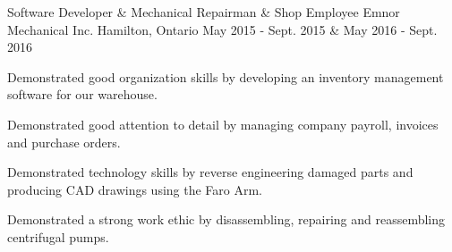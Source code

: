 \begin{cventries}
  \cventry
    {Software Developer \& Mechanical Repairman \& Shop Employee} %
    {Emnor Mechanical Inc.} %
    {Hamilton, Ontario} %
    {May 2015 - Sept. 2015 \& May 2016 - Sept. 2016} %
    {
      \begin{cvitems} %
        \item {Demonstrated good organization skills by developing an inventory management software for our warehouse.}
        \item {Demonstrated good attention to detail by managing company payroll, invoices and purchase orders.}
        \item {Demonstrated technology skills by reverse engineering damaged parts and producing CAD drawings using the Faro Arm.}
        \item {Demonstrated a strong work ethic by disassembling, repairing and reassembling centrifugal pumps.}
      \end{cvitems}
    }


\end{cventries}
